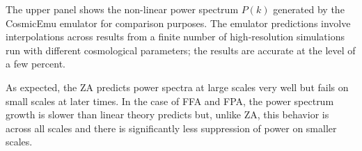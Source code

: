 The upper panel shows the non-linear power spectrum $P(k)$ generated by the CosmicEmu emulator \parencite{Heitmann:2015xma} for comparison purposes. The emulator predictions involve interpolations across results from a finite number of high-resolution simulations run with different cosmological parameters; the results are accurate at the level of a few percent.

As expected, the ZA predicts power spectra at large scales very well but fails on small scales at later times. In the case of FFA and FPA, the power spectrum growth is slower than linear theory predicts but, unlike ZA, this behavior is across all scales and there is significantly less suppression of power on smaller scales.